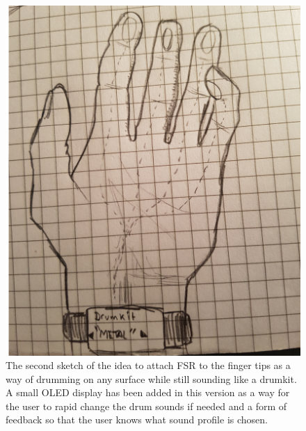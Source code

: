 \begin{figure}
\centering
\includegraphics[scale=0.10]{Figure/sketch_2.jpg}
\caption{The second sketch of the idea to attach FSR to the finger tips as a way of drumming on any surface while still sounding like a drumkit. A small OLED display has been added in this version as a way for the user to rapid change the drum sounds if needed and a form of feedback so that the user knows what sound profile is chosen.}
\label{fig:sketch_2}
\end{figure}